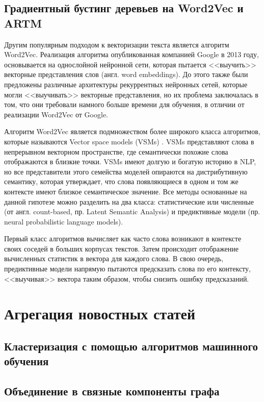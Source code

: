 \documentclass[a4paper, 14pt]{extarticle}
\begin{document}
\subsection{Градиентный бустинг деревьев на Word2Vec и ARTM}
Другим популярным подходом к векторизации текста является алгоритм Word2Vec.
Реализация алгоритма опубликованная компанией Google \cite{DBLP:journals/corr/abs-1301-3781} в 2013 году,
основывается на однослойной нейронной сети, которая пытается <<выучить>> векторные представления слов (англ. word embeddings).
До этого также были предложены различные архитектуры рекуррентных нейронных сетей, которые могли <<выучивать>> векторные представления,
но их проблема заключалась в том, что они требовали намного больше времени для обучения, в отличии от реализации Word2Vec от Google.

Алгоритм Word2Vec является подмножеством более широкого класса алгоритмов, которые называются Vector space models (VSMs) 
\cite{Salton:1975:VSM:361219.361220}. VSMs представляют слова в непрерывном векторном пространстве, где семантически похожие
слова отображаются в близкие точки. VSMs имеют долгую и богатую историю в NLP, но все представители этого семейства моделей опираются
на дистрибутивную семантику, которая утверждает, что слова появляющиеся в одном и том же контексте имеют близкое семантическое значение.
Все методы основанные на данной гипотезе можно разделить на два класса: статистические или численные (от англ. count-based, пр. Latent Semantic 
Analysis) и предиктивные модели (пр. neural probabilistic language models).

Первый класс алгоритмов вычисляет как часто слова возникают в контексте своих соседей в больших корпусах текстов. Затем происходит отображение
вычисленных статистик в вектора для каждого слова. В свою очередь, предиктивные модели напрямую пытаются предсказать слова по его контексту,
<<выучивая>> вектора таким образом, чтобы снизить ошибку предсказаний.




\section{Агрегация новостных статей}
\subsection{Кластеризация с помощью алгоритмов машинного обучения}
\subsection{Объединение в связные компоненты графа}
\end{document}
